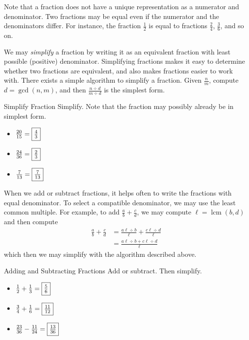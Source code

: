 \documentclass[a4paper,10pt]{report}
\begin{document}
Note that a fraction does not have a unique representation as a numerator and
denominator. Two fractions may be equal even if the numerator and the
denominators differ. For instance, the fraction $\frac{1}{2}$ is equal to
fractions $\frac{2}{4}$, $\frac{3}{6}$, and so on.

We may \emph{simplify} a fraction by writing it as an equivalent fraction with
least possible (positive) denominator. Simplifying fractions makes it easy to
determine whether two fractions are equivalent, and also makes fractions easier
to work with. There exists a simple algorithm to simplify a fraction. Given
$\frac{n}{m}$, compute $d=\gcd(n, m)$, and then $\frac{n\div d}{m\div d}$ is the
simplest form.

\begin{problem}{Simplify Fraction}
 Simplify. Note that the fraction may possibly already be in simplest form.

 \begin{itemize}
  \item $\frac{20}{15}=\Ans{\frac{4}{3}}$
  \item $\frac{24}{36}=\Ans{\frac{2}{3}}$
  \item $\frac{7}{13}=\Ans{\frac{7}{13}}$
 \end{itemize}
\end{problem}

When we add or subtract fractions, it helps often to write the fractions with
equal denominator. To select a compatible denominator, we may use the least
common multiple. For example, to add $\frac{a}{b}+\frac{c}{d}$, we may compute
$\ell=\operatorname{lcm}(b, d)$ and then compute \begin{align*}
 \frac{a}{b}+\frac{c}{d}
 &= \frac{a\ell\div b}{\ell} + \frac{c\ell\div d}{\ell} \\
 &= \frac{a\ell\div b + c\ell\div d}{\ell}
\end{align*} which then we may simplify with the algorithm described above.

\begin{problem}{Adding and Subtracting Fractions}
 Add or subtract. Then simplify.

 \begin{itemize}
  \item $\frac{1}{2} + \frac{1}{3} = \Ans{\frac{5}{6}}$
  \item $\frac{3}{4} + \frac{1}{6} = \Ans{\frac{11}{12}}$
  \item $\frac{23}{36} - \frac{11}{24} = \Ans{\frac{13}{36}}$
 \end{itemize}
\end{problem}
\end{document}
